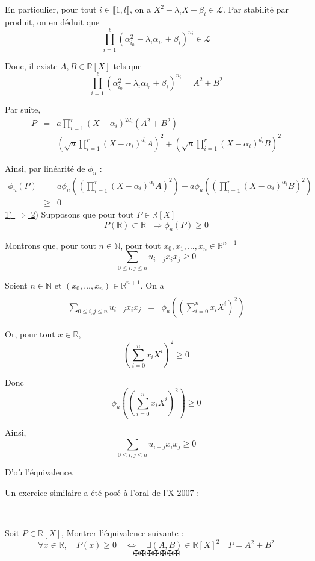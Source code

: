 En particulier, pour tout $i \in \llbracket 1, l \rrbracket$, on a $X^2 -
\lambda_i X + \beta_i \in \mathcal{L}$. Par stabilit{\'e} par produit, on en
d{\'e}duit que
\[ \prod_{i = 1}^{\ell} (\alpha_{i_0}^2 - \lambda_i \alpha_{i_0} +
   \beta_i)^{n_i} \in \mathcal{L} \]


Donc, il existe $A, B \in \mathbb{R} [X]$ tels que
\[ \prod_{i = 1}^{\ell} (\alpha_{i_0}^2 - \lambda_i \alpha_{i_0} +
   \beta_i)^{n_i} = A^2 + B^2 \]


Par suite,
\begin{eqnarray*}
  P & = & a \prod_{i = 1}^r (X - \alpha_i)^{2 d_i} (A^2 + B^2)\\
  &  & \left( \sqrt{a} \prod_{i = 1}^r (X - \alpha_i)^{d_i} A \right)^2 +
  \left( \sqrt{a} \prod_{i = 1}^r (X - \alpha_i)^{d_i} B \right)^2
\end{eqnarray*}


Ainsi, par lin{\'e}arit{\'e} de $\phi_u$ :
\begin{eqnarray*}
  \phi_u (P) & = & a \phi_u ((\prod_{i = 1}^r (X - \alpha_i)^{\alpha_i} A)^2)
  + a \phi_u ((\prod_{i = 1}^r (X - \alpha_i)^{\alpha_i} B)^2)\\
  & \geqslant & 0
\end{eqnarray*}
\underline{1) $\Rightarrow$ 2)} Supposons que pour tout $P \in \mathbb{R} [X]$
\[ P (\mathbb{R}) \subset \mathbb{R}^+ \Rightarrow \phi_u (P) \geq 0 \]


Montrons que, pour tout $n \in \mathbb{N}$, pour tout $x_0, x_1, \ldots, x_n
\in \mathbb{R}^{n + 1}$
\[ \sum_{0 \leq i, j \leq n} u_{i + j} x_i x_j \geq 0 \]


Soient $n \in \mathbb{N}$ et $(x_0, \ldots, x_n) \in \mathbb{R}^{n + 1}$. On a
\begin{eqnarray*}
  &  & 
\end{eqnarray*}
\begin{eqnarray*}
  \sum_{0 \leq i, j \leq n} u_{i + j} x_i x_j & = & \phi_u ((\sum_{i = 0}^n
  x_i X^i)^2)
\end{eqnarray*}


Or, pour tout $x \in \mathbb{R}$,
\[ (\sum_{i = 0}^n x_i X^i)^2 \geq 0 \]


Donc
\[ \phi_u ((\sum_{i = 0}^n x_i X^i)^2) \geq 0 \]


Ainsi,
\[ \sum_{0 \leq i, j \leq n} u_{i + j} x_i x_j \geq 0 \]


D'o{\`u} l'{\'e}quivalence.

 Un exercice similaire a {\'e}t{\'e} pos{\'e} {\`a} l'oral
de l'X 2007 :

\

Soit $P \in \mathbb{R} [X]$, Montrer l'{\'e}quivalence suivante :
\[ \forall x \in \mathbb{R}, \quad P (x) \geqslant 0 \quad \Leftrightarrow
   \quad \exists (A, B) \in \mathbb{R} [X]^2 \quad P = A^2 + B^2 \]
\[ \maltese \maltese \maltese \maltese \maltese \maltese \maltese \]
